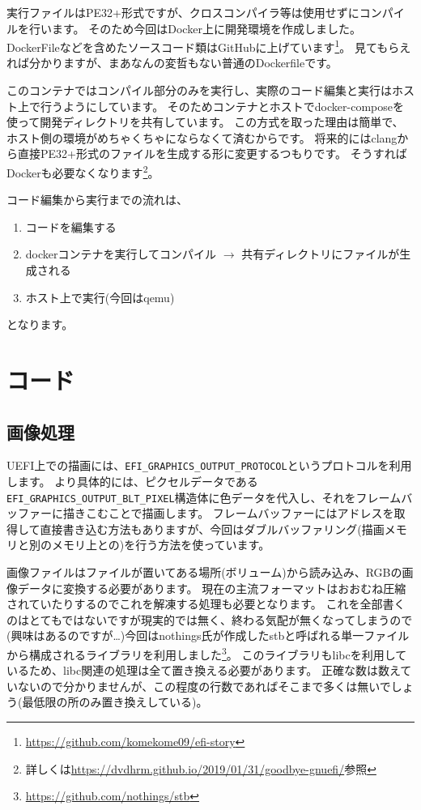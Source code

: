 \documentclass[10pt, b5paper, openany]{ltjsbook}
\begin{document}
実行ファイルはPE32+形式ですが、クロスコンパイラ等は使用せずにコンパイルを行います。
そのため今回はDocker上に開発環境を作成しました。
DockerFileなどを含めたソースコード類はGitHubに上げています\footnote{\url{https://github.com/komekome09/efi-story}}。
見てもらえれば分かりますが、まあなんの変哲もない普通のDockerfileです。

このコンテナではコンパイル部分のみを実行し、実際のコード編集と実行はホスト上で行うようにしています。
そのためコンテナとホストでdocker-composeを使って開発ディレクトリを共有しています。
この方式を取った理由は簡単で、ホスト側の環境がめちゃくちゃにならなくて済むからです。
将来的にはclangから直接PE32+形式のファイルを生成する形に変更するつもりです。
そうすればDockerも必要なくなります\footnote{詳しくは\url{https://dvdhrm.github.io/2019/01/31/goodbye-gnuefi/}参照}。

コード編集から実行までの流れは、
\begin{enumerate}
    \item コードを編集する
    \item dockerコンテナを実行してコンパイル $\rightarrow$ 共有ディレクトリにファイルが生成される
    \item ホスト上で実行(今回はqemu)
\end{enumerate}
となります。

\chapter{コード}
\section{画像処理}
UEFI上での描画には、\verb+EFI_GRAPHICS_OUTPUT_PROTOCOL+というプロトコルを利用します。
より具体的には、ピクセルデータである\verb+EFI_GRAPHICS_OUTPUT_BLT_PIXEL+構造体に色データを代入し、それをフレームバッファーに描きこむことで描画します。
フレームバッファーにはアドレスを取得して直接書き込む方法もありますが、今回はダブルバッファリング(描画メモリと別のメモリ上との)を行う方法を使っています。

画像ファイルはファイルが置いてある場所(ボリューム)から読み込み、RGBの画像データに変換する必要があります。
現在の主流フォーマットはおおむね圧縮されていたりするのでこれを解凍する処理も必要となります。
これを全部書くのはとてもではないですが現実的では無く、終わる気配が無くなってしまうので(興味はあるのですが…)今回はnothings氏が作成したstbと呼ばれる単一ファイルから構成されるライブラリを利用しました\footnote{\url{https://github.com/nothings/stb}}。
このライブラリもlibcを利用しているため、libc関連の処理は全て置き換える必要があります。
正確な数は数えていないので分かりませんが、この程度の行数であればそこまで多くは無いでしょう(最低限の所のみ置き換えしている)。
\end{document}
